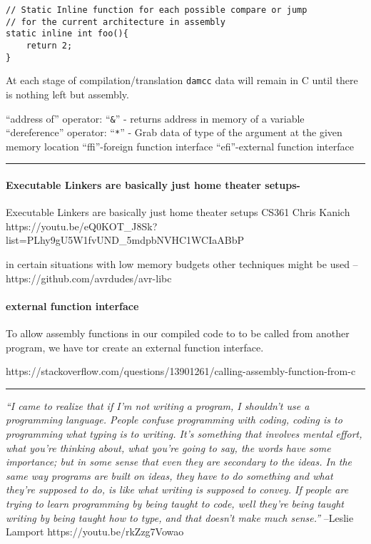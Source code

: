 \begin{verbatim}
// Static Inline function for each possible compare or jump
// for the current architecture in assembly
static inline int foo(){
    return 2;
}
\end{verbatim}

At each stage of compilation/translation \texttt{damcc} data will remain
in C until there is nothing left but assembly.

``address of'' operator: ``\texttt{\&}'' - returns address in memory of
a variable ``dereference'' operator: ``\texttt{*}'' - Grab data of type
of the argument at the given memory location ``ffi''-foreign function
interface ``efi''-external function interface

\begin{center}\rule{0.5\linewidth}{0.5pt}\end{center}

\hypertarget{executable-linkers-are-basically-just-home-theater-setups-}{%
\paragraph{Executable Linkers are basically just home theater
setups-}\label{executable-linkers-are-basically-just-home-theater-setups-}}

Executable Linkers are basically just home theater setups CS361 Chris
Kanich
https://youtu.be/eQ0KOT\_J8Sk?list=PLhy9gU5W1fvUND\_5mdpbNVHC1WCIaABbP

in certain situations with low memory budgets other techniques might be
used --https://github.com/avrdudes/avr-libc

\hypertarget{external-function-interface}{%
\paragraph{external function
interface}\label{external-function-interface}}

To allow assembly functions in our compiled code to to be called from
another program, we have tor create an external function interface.

https://stackoverflow.com/questions/13901261/calling-assembly-function-from-c

\begin{center}\rule{0.5\linewidth}{0.5pt}\end{center}

\emph{``I came to realize that if I'm not writing a program, I shouldn't
use a programming language. People confuse programming with coding,
coding is to programming what typing is to writing. It's something that
involves mental effort, what you're thinking about, what you're going to
say, the words have some importance; but in some sense that even they
are secondary to the ideas. In the same way programs are built on ideas,
they have to do something and what they're supposed to do, is like what
writing is supposed to convey. If people are trying to learn programming
by being taught to code, well they're being taught writing by being
taught how to type, and that doesn't make much sense.''} --Leslie
Lamport https://youtu.be/rkZzg7Vowao


